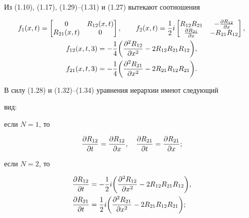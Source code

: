 Из (1.10), (1.17), (1.29)--(1.31) и (1.27) вытекают соотношения 


\begin{gather} 


f_1(x,t)=\begin{bmatrix} 


0 & R_{12}(x,t) \\ R_{21}(x,t) & 0 \end{bmatrix},\qquad 


f_2(x,t)=\frac{1}{2}i\begin{bmatrix} 


R_{12}R_{21} & -\myfrac{R_{12}}{x} \\ 


\myfrac{R_{21}}{x} & -R_{21}R_{12} 


\end{bmatrix} 


, \\ 


\begin{align} 


f_{12}(x,t,3)&=-\frac{1}{4}\bigg(\myfrac{^2R_{12}}{x^2}- 


2R_{12}R_{21}R_{12}\bigg), \\ 


f_{21}(x,t,3)&=-\frac{1}{4}\bigg(\myfrac{^2R_{21}}{x^2}- 


2R_{21}R_{12}R_{21}\bigg). 


\end{align} 


\end{gather} 


В силу (1.28) и (1.32)--(1.34) уравнения иерархии имеют следующий 


вид: 


 


если $N=1$, то 


$$ 


\myfrac{R_{12}}{t}=\myfrac{R_{12}}{x},\quad 


\myfrac{R_{21}}{t}=\myfrac{R_{21}}{x}; 


$$ 





если $N=2$, то 


\begin{equation} 




\begin{split} 


\myfrac{R_{12}}{t}&=-\frac{1}{2}i\bigg( 


\myfrac{^2R_{12}}{x^2}-2R_{12}R_{21}R_{12}\bigg),\\ 


\myfrac{R_{21}}{t}&=\frac{1}{2}i\bigg(\myfrac{^2R_{21}}{x^2}- 


2R_{21}R_{12}R_{21}\bigg); 


\end{split} 




\end{equation} 


